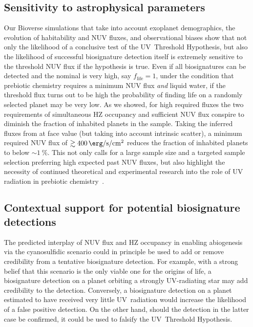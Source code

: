 \documentclass[twocolumn,twocolappendix,linenumbers]{aastex631}
\begin{document}
\subsection{Sensitivity to astrophysical parameters} %
Our Bioverse simulations that take into account exoplanet demographics, the evolution of habitability and \gls{NUV} fluxes, and observational biases show that not only the likelihood of a conclusive test of the UV~Threshold Hypothesis, but also the likelihood of successful biosignature detection itself is extremely sensitive to the threshold \gls{NUV} flux if the hypothesis is true.
Even if all biosignatures can be detected and the nominal  is very high, say $f_\mathrm{life} = 1$, under the condition that prebiotic chemistry requires a minimum \gls{NUV} flux \textit{and} liquid water, if the threshold flux turns out to be high the probability of finding life on a randomly selected planet may be very low.
As we showed, for high required fluxes the two requirements of simultaneous \gls{HZ} occupancy and sufficient \gls{NUV} flux conspire to diminish the fraction of inhabited planets in the sample.
Taking the inferred fluxes from \citet{Richey-Yowell2023} at face value (but taking into account intrinsic scatter), a minimum required \gls{NUV} flux of $\gtrsim\SI{400}{\erg\per\second\per\centi\meter\squared}$ reduces the fraction of inhabited planets to below $\sim\SI{1}{\percent}$.
This not only calls for a large sample size and a targeted sample selection preferring high expected past \gls{NUV} fluxes, but also highlight the necessity of continued theoretical and experimental research into the role of \gls{UV} radiation in prebiotic chemistry~\citep{Ranjan2017b,Rimmer2018,Rimmer2021}.





\subsection{Contextual support for potential biosignature detections} %
The predicted interplay of \gls{NUV} flux and \gls{HZ} occupancy in enabling abiogenesis via the cyanosulfidic scenario could in principle be used to add or remove credibility from a tentative biosignature detection.
For example, with a strong belief that this scenario is the only viable one for the origins of life, a biosignature detection on a planet orbiting a strongly UV-radiating star may add credibility to the detection.
Conversely, a biosignature detection on a planet estimated to have received very little UV~radiation would increase the likelihood of a false positive detection.
On the other hand, should the detection in the latter case be confirmed, it could be used to falsify the UV~Threshold Hypothesis.
\end{document}
